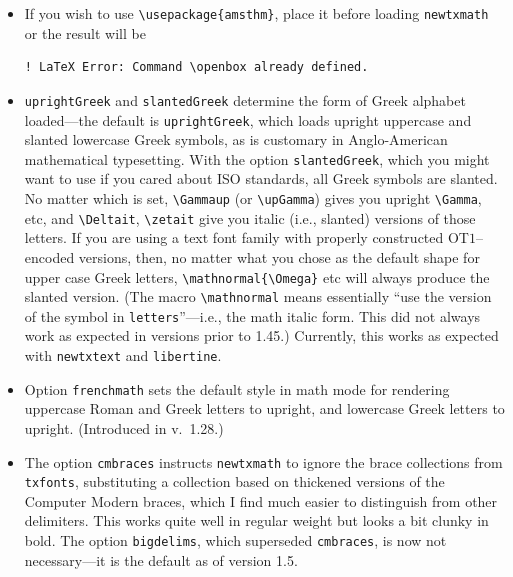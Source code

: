 \documentclass[11pt]{article}
\theoremstyle{oldplain}
\theoremstyle{plain}
\begin{document}
\begin{itemize}
\begin{verbatim}
\usepackage{newtxmath}
\end{verbatim}
causes no error, unlike the same combination with {\tt txfonts}, but does nothing significant. (Recall that {\tt amsmath} is loaded automatically if you use an \textsc{ams} document class such as {\tt amsart} or {\tt amsbook}, as is {\tt amsthm}.) 
\item If you wish to use \verb|\usepackage{amsthm}|, place it before loading {\tt newtxmath} or the result will  be
\begin{verbatim}
! LaTeX Error: Command \openbox already defined.
\end{verbatim}
\item {\tt uprightGreek} and {\tt slantedGreek} determine the form of Greek alphabet loaded---the default is {\tt uprightGreek}, which loads upright uppercase and slanted lowercase Greek symbols, as is customary in Anglo-American mathematical typesetting. With the option {\tt slantedGreek}, which you might want to use if you cared about ISO standards, all Greek symbols are slanted. No matter which is set, \verb|\Gammaup| (or \verb|\upGamma|) gives you upright \verb|\Gamma|, etc, and \verb|\Deltait|, \verb|\zetait| give you italic (i.e., slanted) versions of those letters. If you are using a text font family with properly constructed OT$1$--encoded versions, then, no matter what you chose as the default shape for upper case Greek letters, \verb|\mathnormal{\Omega}| etc will always produce the slanted version. (The macro \verb|\mathnormal| means essentially ``use the version of the symbol in {\tt letters}''---i.e., the math italic form. This did not always work as expected in versions prior to 1.45.) Currently, this works as expected with {\tt newtxtext} and {\tt libertine}. 
\item Option {\tt frenchmath} sets the default style in math mode for rendering uppercase Roman and Greek letters to upright, and lowercase Greek letters to upright. (Introduced in v.\ 1.28.)
\item The option {\tt cmbraces} instructs {\tt newtxmath} to ignore the brace collections from {\tt txfonts}, substituting a collection based on thickened versions of the Computer Modern braces, which I find much easier to distinguish from other delimiters. This works quite well in regular weight but looks a bit clunky in bold. The option {\tt bigdelims}, which superseded {\tt cmbraces}, is now not necessary---it is the default as of version 1.5.

\end{itemize}
\end{document}
